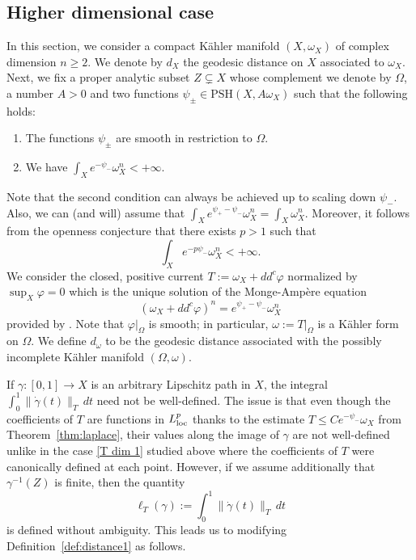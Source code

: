 \documentclass[a4paper,11pt,leqno,english]{smfart}
\theoremstyle{plain}
\theoremstyle{plain}
\numberwithin{equation}{section} %
\numberwithin{figure}{section} %
\theoremstyle{plain}
\theoremstyle{plain}
\theoremstyle{remark}
\theoremstyle{remark}
\theoremstyle{definition}
\theoremstyle{plain}
\theoremstyle{plain}
\theoremstyle{definition}
\newcommand{\om}{\omega}
\renewcommand{\ge}{\geq}
\renewcommand{\le}{\leq}
\begin{document}
 
 
  


\subsection{Higher dimensional case}
\label{higher dim}

 In this section, we consider a compact Kähler manifold $(X, \omega_X)$ of complex dimension $n\ge2$. We denote by $d_X$ the geodesic distance on $X$ associated to $\om_X$. Next, we fix a proper analytic subset $Z\subsetneq X$ whose complement we denote by $\Omega$, a number $A>0$ and two functions $\psi_\pm\in \mathrm{PSH}(X,A\omega_X)$ such that the following holds: 
 \begin{enumerate}[label=$\bullet$]
 \item The functions $\psi_\pm$ are smooth in restriction to $\Omega$. 
 \item We have $\int_X e^{-\psi_-}\omega_X^n<+\infty$. 
\end{enumerate}
Note that the second condition can always be achieved up to scaling down $\psi_-$. 
Also, we can (and will) assume that $\int_X e^{\psi_+-\psi_-}\omega_X^n=\int_X \omega_X^n$. Moreover, it follows from the openness conjecture \cite{BoB15,GuanZhou15} that there exists $p>1$ such that 
\begin{equation}
\label{Lp}
\int_X e^{-p\psi_-}\omega_X^n<+\infty.
\end{equation} We consider the closed, positive current $T:=\omega_X+dd^c \varphi$ normalized by $\sup_X \varphi=0$ which is the unique solution of the Monge-Ampère equation 
\begin{equation}
\label{MA phi}
(\omega_X+dd^c \varphi)^n=e^{\psi_+-\psi_-}\omega_X^n
\end{equation}
provided by \cite{Kol98}. 
Note that $\varphi|_\Omega$ is smooth; in particular, $\omega:=T|_{\Omega}$ is a Kähler form on $\Omega$.   We define $d_{\omega}$ to be the geodesic distance associated with the possibly incomplete Kähler manifold $(\Omega, \omega)$.

If $\gamma:[0, 1]\to X$ is an arbitrary Lipschitz path in $X$, the integral $\int_0^1 \|\dot \gamma(t)\|_T\, dt$ need not be well-defined. The issue is that even though the coefficients of $T$ are functions in $L^p_{\rm loc}$ thanks to the estimate $T\le Ce^{-\psi_-}\omega_X$ from Theorem~\ref{thm:laplace}, their values along the image of $\gamma$ are not well-defined unlike in the case \eqref{T dim 1} studied above where the coefficients of $T$ were canonically defined at each point. However, if we assume additionally that $\gamma^{-1}(Z)$ is finite, then 
the quantity
\[\ell_T(\gamma):=\int_0^1 \|\dot \gamma(t)\|_T \,dt\]
is defined without ambiguity. This leads us to modifying Definition~\ref{def:distance1} as follows. 
\end{document}
